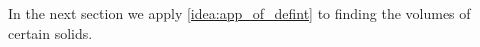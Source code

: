 %
%
%

In the next section we apply \autoref{idea:app_of_defint} to finding the volumes of certain solids.

